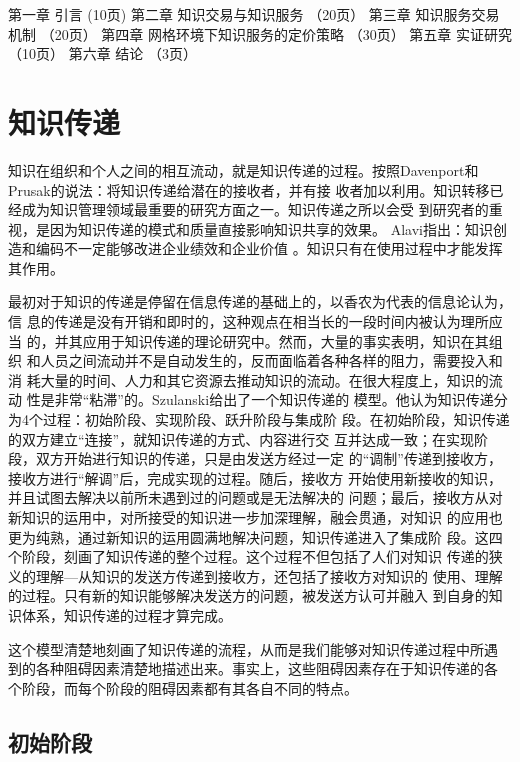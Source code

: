 \documentclass[12pt,a4paper]{ctexart}
\begin{document}
第一章	引言 (10页)
第二章	知识交易与知识服务 （20页）
第三章	知识服务交易机制  （20页）
第四章	网格环境下知识服务的定价策略 （30页）
第五章	实证研究 （10页）
第六章	结论  （3页）

\section{知识传递}
知识在组织和个人之间的相互流动，就是知识传递的过程。按照Davenport和
Prusak\cite{davenport1998wko}的说法：将知识传递给潜在的接收者，并有接
收者加以利用。知识转移已经成为知识管理领域最重要的研究方面之一。知识传递之所以会受
到研究者的重视，是因为知识传递的模式和质量直接影响知识共享的效果。
Alavi指出：知识创造和编码不一定能够改进企业绩效和企业价值
\cite{alavi2000mok}。知识只有在使用过程中才能发挥其作用。

最初对于知识的传递是停留在信息传递的基础上的，以香农\cite{Shannon1949}为代表的信息论认为，信
息的传递是没有开销和即时的，这种观点在相当长的一段时间内被认为理所应当
的，并其应用于知识传递的理论研究中。然而，大量的事实表明，知识在其组织
和人员之间流动并不是自动发生的，反而面临着各种各样的阻力，需要投入和消
耗大量的时间、人力和其它资源去推动知识的流动。在很大程度上，知识的流动
性是非常“粘滞”的。Szulanski\cite{szulanski2000pkt}给出了一个知识传递的
模型。他认为知识传递分为4个过程：初始阶段、实现阶段、跃升阶段与集成阶
段。在初始阶段，知识传递的双方建立“连接”，就知识传递的方式、内容进行交
互并达成一致；在实现阶段，双方开始进行知识的传递，只是由发送方经过一定
的“调制”传递到接收方，接收方进行“解调”后，完成实现的过程。随后，接收方
开始使用新接收的知识，并且试图去解决以前所未遇到过的问题或是无法解决的
问题；最后，接收方从对新知识的运用中，对所接受的知识进一步加深理解，融会贯通，对知识
的应用也更为纯熟，通过新知识的运用圆满地解决问题，知识传递进入了集成阶
段。这四个阶段，刻画了知识传递的整个过程。这个过程不但包括了人们对知识
传递的狭义的理解---从知识的发送方传递到接收方，还包括了接收方对知识的
使用、理解的过程。只有新的知识能够解决发送方的问题，被发送方认可并融入
到自身的知识体系，知识传递的过程才算完成。

这个模型清楚地刻画了知识传递的流程，从而是我们能够对知识传递过程中所遇
到的各种阻碍因素清楚地描述出来。事实上，这些阻碍因素存在于知识传递的各
个阶段，而每个阶段的阻碍因素都有其各自不同的特点。

\subsection{初始阶段}
\end{document}
